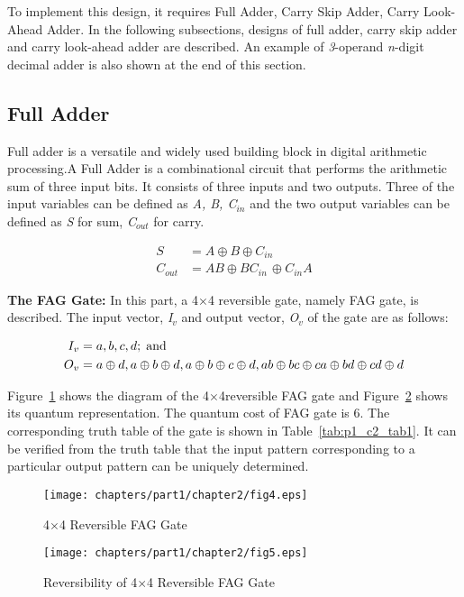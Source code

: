 To implement this design, it requires Full Adder, Carry Skip Adder, Carry Look-Ahead Adder. In the following subsections, designs of full adder, carry skip adder and carry look-ahead adder are described. An example of {\it 3}-operand {\it n}-digit decimal adder is also shown at the end of this section.


\subsection{Full Adder}
Full adder is a versatile and widely used building block in digital arithmetic processing.A Full Adder is a combinational circuit that performs the arithmetic sum of three input bits. It consists of three inputs and two outputs. Three of the input variables can be defined as {\it A, B, C${}_{in}$} and the two output variables can be defined as {\it S} for sum, {\it C${}_{out}$} for carry.

\begin{align*}
S &= A \oplus  B \oplus  C{}_{in}\\
C{}_{out} &= AB \oplus  BC{}_{in\ }\oplus  C{}_{in}A
\end{align*}

\noindent\textbf{The FAG Gate:} In this part, a {4$\times$4} reversible gate, namely FAG gate, is described. The input vector, {\it I${}_{v}$} and output vector, {\it O${}_{v}$} of the gate are as follows:

\begin{align*}
I_{v} &= {a, b, c, d}; \;\textnormal{and}\\
O_{v} &= {a\oplus d, a\oplus b\oplus d, a\oplus b\oplus c\oplus d, ab\oplus bc\oplus ca\oplus bd\oplus cd\oplus d}
\end{align*}

Figure~\ref{fig:p1_c2_fig4} shows the diagram of the {4$\times$4}reversible FAG gate and Figure~\ref{fig:p1_c2_fig5} shows its quantum representation. The quantum cost of FAG gate is 6. The corresponding truth table of the gate is shown in Table~\ref{tab:p1_c2_tab1}. It can be verified from the truth table that the input pattern corresponding to a particular output pattern can be uniquely determined.

\begin{figure}[!tbh]
	\centering
	\texttt{[image: chapters/part1/chapter2/fig4.eps]}
	\caption{{4$\times$4} Reversible FAG Gate}
	\label{fig:p1_c2_fig4}
\end{figure}

\begin{figure}[!tbh]
	\centering
	\texttt{[image: chapters/part1/chapter2/fig5.eps]}
	\caption{Reversibility of {4${\times}$4} Reversible FAG Gate}
	\label{fig:p1_c2_fig5}
\end{figure}




